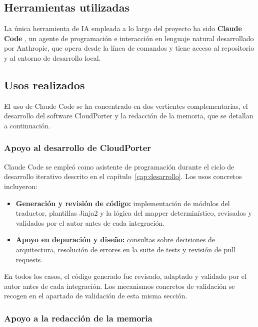 \subsection{Herramientas utilizadas}

La única herramienta de IA empleada a lo largo del proyecto ha sido \textbf{Claude Code}
\cite{claudeCode}, un agente de programación e interacción en lenguaje natural desarrollado
por Anthropic, que opera desde la línea de comandos y tiene acceso al repositorio y al
entorno de desarrollo local.

\subsection{Usos realizados}

El uso de Claude Code se ha concentrado en dos vertientes complementarias, el desarrollo del
software CloudPorter y la redacción de la memoria, que se detallan a continuación.

\subsubsection*{Apoyo al desarrollo de CloudPorter}

Claude Code se empleó como asistente de programación durante el ciclo de desarrollo iterativo
descrito en el capítulo~\ref{cap:desarrollo}. Los usos concretos incluyeron:

\begin{itemize}
    \item \textbf{Generación y revisión de código:} implementación de módulos del traductor,
    plantillas Jinja2 y la lógica del mapper determinístico, revisados y validados por el
    autor antes de cada integración.
    \item \textbf{Apoyo en depuración y diseño:} consultas sobre decisiones de arquitectura,
    resolución de errores en la suite de tests y revisión de pull requests.
\end{itemize}

En todos los casos, el código generado fue revisado, adaptado y validado por el autor antes
de cada integración. Los mecanismos concretos de validación se recogen en el apartado de
validación de esta misma sección.

\subsubsection*{Apoyo a la redacción de la memoria}

